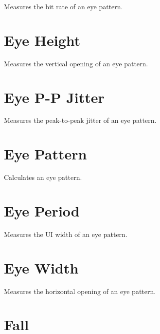 Measures the bit rate of an eye pattern.

\pagebreak
\section{Eye Height}

Measures the vertical opening of an eye pattern.

\pagebreak
\section{Eye P-P Jitter}

Measures the peak-to-peak jitter of an eye pattern.

\pagebreak
\section{Eye Pattern}

Calculates an eye pattern.

\pagebreak
\section{Eye Period}

Measures the UI width of an eye pattern.

\pagebreak
\section{Eye Width}

Measures the horizontal opening of an eye pattern.

\pagebreak
\section{Fall}

